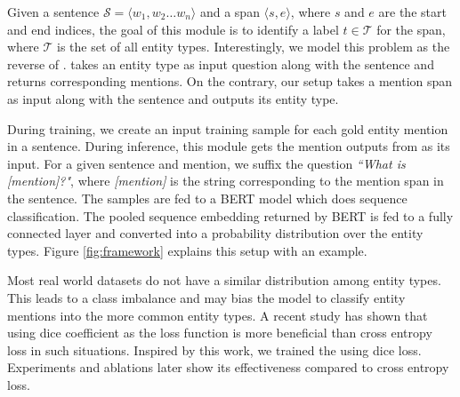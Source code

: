 Given a sentence $\mathcal{S} = \langle w_1, w_2 \ldots w_n \rangle$ and a span $\langle s, e\rangle$, where $s$ and $e$ are the start and end indices, the goal of this module is to identify a label $t \in \mathcal{T}$  for the span, where $\mathcal{T}$ is the set of all entity types.
Interestingly, we model this problem as the reverse of .  takes an entity type as input question along with the sentence and returns corresponding mentions. On the contrary, our setup takes a mention span as input along with the sentence and outputs its entity type.

During training, we create an input training sample for each gold entity mention in a sentence. During inference, this module gets the mention outputs from \spandetect{} as its input. For a given sentence and mention, we suffix the question \textit{``What is [mention]?"}, where \textit{[mention]} is the string corresponding to the mention span in the sentence. The samples are fed to a BERT model which does sequence classification. The pooled sequence embedding returned by BERT is fed to a fully connected layer and converted into a probability distribution over the entity types. Figure \ref{fig:framework} explains this setup with an example.


Most real world datasets do not have a similar distribution among entity types. %
This leads to a class imbalance and may bias the model to classify entity mentions into the more common entity types. A recent study \cite{li2019dice} has shown that using dice coefficient as the loss function is more beneficial than cross entropy loss in such situations. Inspired by this work, we trained the \spanclass{} using dice loss. Experiments and ablations later show its effectiveness compared to cross entropy loss. 

